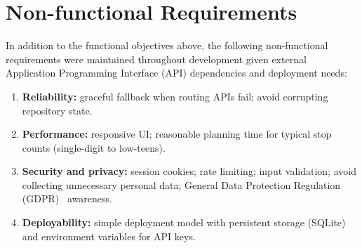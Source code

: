 \section{Non-functional Requirements}
In addition to the functional objectives above, the following non-functional requirements were maintained throughout development given external Application Programming Interface (API) dependencies and deployment needs:

\begin{enumerate}[label=\textbf{NF\arabic*}]
  \item \textbf{Reliability:} graceful fallback when routing APIs fail; avoid
        corrupting repository state.
  \item \textbf{Performance:} responsive UI; reasonable planning time for
        typical stop counts (single-digit to low-teens).
  \item \textbf{Security and privacy:} session cookies; rate limiting; input
        validation; avoid collecting unnecessary personal data; General Data Protection Regulation (GDPR)~\cite{ref_gdpr} awareness.
  \item \textbf{Deployability:} simple deployment model with persistent storage
        (SQLite) and environment variables for API keys.
\end{enumerate}
